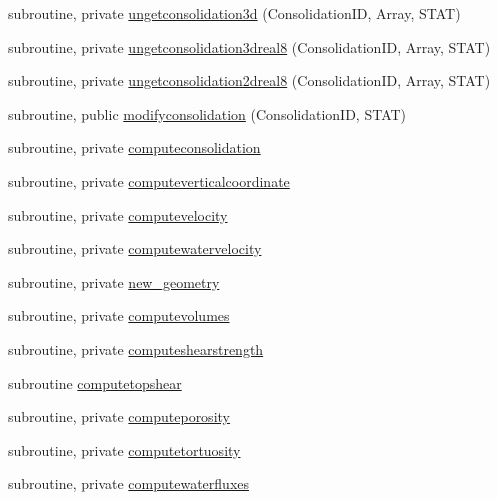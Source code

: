 \begin{DoxyCompactItemize}
\item 
subroutine, private \mbox{\hyperlink{namespacemoduleconsolidation_affeed262d558e9c88366602767505b07}{ungetconsolidation3d}} (Consolidation\+ID, Array, S\+T\+AT)
\item 
subroutine, private \mbox{\hyperlink{namespacemoduleconsolidation_a2dbd54c6dd99b8f825bc7223f4e88f8b}{ungetconsolidation3dreal8}} (Consolidation\+ID, Array, S\+T\+AT)
\item 
subroutine, private \mbox{\hyperlink{namespacemoduleconsolidation_a72d92545dc323c3374c46a863489ab61}{ungetconsolidation2dreal8}} (Consolidation\+ID, Array, S\+T\+AT)
\item 
subroutine, public \mbox{\hyperlink{namespacemoduleconsolidation_a0143c8577e56dbbb86e0db4d5927c316}{modifyconsolidation}} (Consolidation\+ID, S\+T\+AT)
\item 
subroutine, private \mbox{\hyperlink{namespacemoduleconsolidation_ad7db155588df8bc22ff9b3934aff50f7}{computeconsolidation}}
\item 
subroutine, private \mbox{\hyperlink{namespacemoduleconsolidation_ab28fd17bb7497eb19ebb09ffb2cef27b}{computeverticalcoordinate}}
\item 
subroutine, private \mbox{\hyperlink{namespacemoduleconsolidation_a8045563d625e785b434b6daeaaf70a49}{computevelocity}}
\item 
subroutine, private \mbox{\hyperlink{namespacemoduleconsolidation_a0237d190c26f864f2f6ab045a5f79795}{computewatervelocity}}
\item 
subroutine, private \mbox{\hyperlink{namespacemoduleconsolidation_a1642d306f23b2cafb2dc89dde15f6e67}{new\+\_\+geometry}}
\item 
subroutine, private \mbox{\hyperlink{namespacemoduleconsolidation_a1b4a867ed2aa36040fc524aad40a9778}{computevolumes}}
\item 
subroutine, private \mbox{\hyperlink{namespacemoduleconsolidation_a461bd405c7105d5b33217ef55e3d96b2}{computeshearstrength}}
\item 
subroutine \mbox{\hyperlink{namespacemoduleconsolidation_a414e2c5a165b95dd5af3741e90f53de4}{computetopshear}}
\item 
subroutine, private \mbox{\hyperlink{namespacemoduleconsolidation_a71e8c451239a619147b24a85ae396e8e}{computeporosity}}
\item 
subroutine, private \mbox{\hyperlink{namespacemoduleconsolidation_a3d7e2a533ad1c35b0dd1288ee25569b1}{computetortuosity}}
\item 
subroutine, private \mbox{\hyperlink{namespacemoduleconsolidation_a28f20455e31c2730b280db8d666f0ce3}{computewaterfluxes}}

\end{DoxyCompactItemize}
